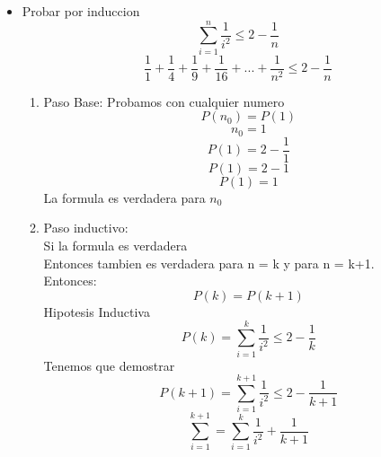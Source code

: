 \documentclass[10pt,a4paper]{article}
\begin{document}
\begin{itemize}
		
		\item Probar por induccion \\
			\begin{equation*}
				\sum_{i=1}^{n} \frac{1}{i^{2}} \leq 2 - \frac{1}{n}
			\end{equation*}
			\begin{equation*}
				\frac{1}{1} + \frac{1}{4} + \frac{1}{9} + \frac{1}{16} + ... + \frac{1}{n^{2}} \leq    2 - \frac{1}{n}
			\end{equation*}
			\begin{enumerate}
				\item Paso Base: Probamos con cualquier numero\\
					\begin{equation*}
						P(n_{0}) = P(1)
					\end{equation*}
					\begin{equation*}
						n_{0} = 1
					\end{equation*}
					\begin{equation*}
						P(1) = 2 - \frac{1}{1}
					\end{equation*}
					\begin{equation*}
						P(1) = 2 - 1
					\end{equation*}
					\begin{equation*}
						P(1) = 1
					\end{equation*}
					La formula es verdadera para $n_{0}$					
				\item Paso inductivo: \\ 
					Si la formula es verdadera\\
					Entonces tambien es verdadera para n = k y para n = k+1. \\
					Entonces:
					\begin{equation*}
						P(k) = P(k+1)
					\end{equation*}
					Hipotesis Inductiva
					\begin{equation*}
						P(k) = \sum_{i=1}^{k} \frac{1}{i^{2}} \leq 2 - \frac{1}{k}
					\end{equation*}
					Tenemos que demostrar 
					\begin{equation*}
						P(k+1) = \sum_{i=1}^{k+1} \frac{1}{i^{2}} \leq 2 - \frac{1}{k+1}
					\end{equation*}
					\begin{equation*}
						\sum_{i=1}^{k+1} = \sum_{i=1}^{k} \frac{1}{i^{2}} + \frac{1}{k+1}
					\end{equation*}
					\begin{equation*}

\end{equation*}
\end{enumerate}
\end{itemize}
\end{document}
